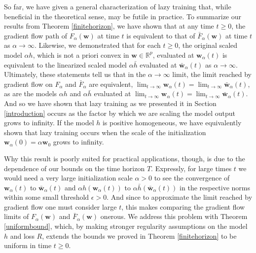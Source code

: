 \documentclass{article}
\begin{document}
So far, we have given a general characterization of lazy training that, while beneficial in the theoretical sense, may be futile in practice. To summarize our results from Theorem \ref{finitehorizon}, we have shown that at any time $t \geq 0$, the gradient flow path of $F_{\alpha}(\boldsymbol{w})$ at time $t$ is equivalent to that of $\bar{F}_{\alpha}(\boldsymbol{w})$ at time $t$ as $\alpha \rightarrow \infty$. Likewise, we demonstrated that for each $t \geq 0$, the original scaled model $\alpha h$, which is not a priori convex in $\boldsymbol{w} \in \mathbb{R}^p$, evaluated at $\boldsymbol{w}_{\alpha}(t)$ is equivalent to the linearized scaled model $\alpha \bar{h}$ evaluated at $\boldsymbol{\bar{w}}_{\alpha}(t)$ as $\alpha \rightarrow \infty$. Ultimately, these statements tell us that in the $\alpha \rightarrow \infty$ limit, the limit reached by gradient flow on $F_{\alpha}$ and $\bar{F}_{\alpha}$ are equivalent, $\lim_{t \to \infty} \boldsymbol{w}_{\alpha}(t) = \lim_{t \to \infty} \boldsymbol{\bar{w}}_{\alpha}(t)$, as are the models $\alpha h$ and $\alpha \bar{h}$ evaluated at $\lim_{t \to \infty} \boldsymbol{w}_{\alpha}(t) = \lim_{t \to \infty} \boldsymbol{\bar{w}}_{\alpha}(t)$. And so we have shown that lazy training as we presented it in Section \ref{introduction} occurs as the factor by which we are scaling the model output grows to infinity. If the model $h$ is positive homogeneous, we have equivalently shown that lazy training occurs when the scale of the initialization $\boldsymbol{w}_{\alpha}(0) = \alpha \boldsymbol{w}_0$ grows to infinity.

Why this result is poorly suited for practical applications, though, is due to the dependence of our bounds on the time horizon $T$. Expressly, for large times $t$ we would need a very large initialization scale $\alpha > 0$ to see the convergence of $\boldsymbol{w}_{\alpha}(t)$ to $\boldsymbol{\bar{w}}_{\alpha}(t)$ and $\alpha h(\boldsymbol{w}_{\alpha}(t))$ to $\alpha \bar{h}(\boldsymbol{\bar{w}}_{\alpha}(t))$ in the respective norms within some small threshold $\epsilon > 0$. And since to approximate the limit reached by gradient flow one must consider large $t$, this makes comparing the gradient flow limits of $F_{\alpha}(\boldsymbol{w})$ and $\bar{F}_{\alpha}(\boldsymbol{w})$ onerous. We address this problem with Theorem \ref{uniformbound}, which, by making stronger regularity assumptions on the model $h$ and loss $R$, extends the bounds we proved in Theorem \ref{finitehorizon} to be uniform in time $t \geq 0$.
\end{document}
